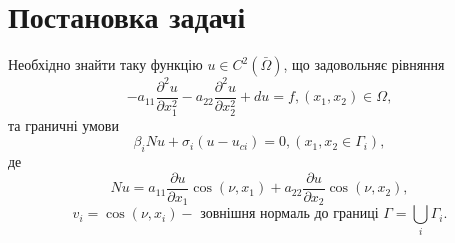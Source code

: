 \documentclass[12pt,a4paper, twoside]{article}
\begin{document}
\section{Постановка задачі}
{
Необхідно знайти таку функцію $u \in C^{2}(\bar{\Omega})$, що задовольняє рівняння
\begin{equation}
-a_{11} \frac{\partial^{2} u}{\partial x_{1}^{2}}-a_{22} \frac{\partial^{2} u}{\partial x_{2}^{2}}+d u=f,\left(x_{1}, x_{2}\right) \in \Omega,
\end{equation}
та граничні умови
\begin{equation}
\beta_{i} N u+\sigma_{i}\left(u-u_{c i}\right)=0,\left(x_{1}, x_{2} \in \Gamma_{i}\right),
\end{equation}
де
\begin{equation*}
N u=a_{11} \frac{\partial u}{\partial x_{1}} \cos \left(\nu, x_{1}\right)+a_{22} \frac{\partial u}{\partial x_{2}} \cos \left(\nu, x_{2}\right),
\end{equation*}
\begin{equation*}
v_{i}=\cos \left(\nu, x_{i}\right)-\text { зовнішня нормаль до границі  } \Gamma=\bigcup_{i} \Gamma_{i}.
\end{equation*}
}
\end{document}

